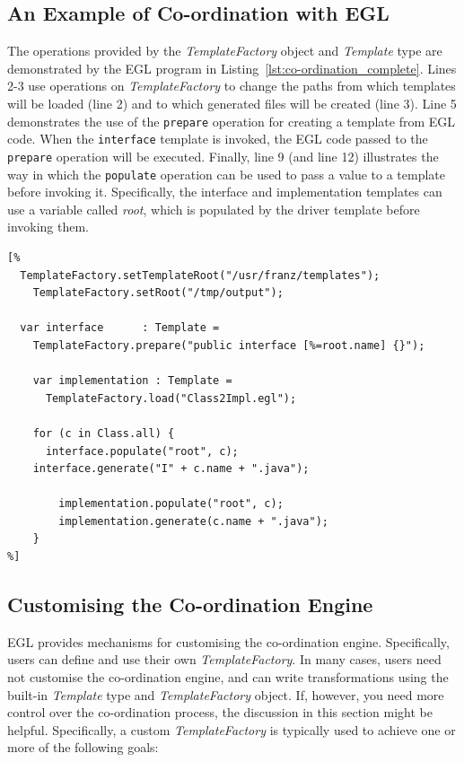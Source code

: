 \subsection{An Example of Co-ordination with EGL}
\label{sec:example_of_co-ordination}
The operations provided by the \emph{TemplateFactory} object and \emph{Template} type are demonstrated by the EGL program in Listing~\ref{lst:co-ordination_complete}. Lines 2-3 use operations on \emph{TemplateFactory} to change the paths from which templates will be loaded (line 2) and to which generated files will be created (line 3). Line 5 demonstrates the use of the \texttt{prepare} operation for creating a template from EGL code. When the \texttt{interface} template is invoked, the EGL code passed to the \texttt{prepare} operation will be executed. Finally, line 9 (and line 12) illustrates the way in which the \texttt{populate} operation can be used to pass a value to a template before invoking it. Specifically, the interface and implementation templates can use a variable called \emph{root}, which is populated by the driver template before invoking them.

\begin{lstlisting}[float=tbp, caption=Using the various operations provided by the Template type and TemplateFactory object., label=lst:co-ordination_complete, language=EGL]
[%
  TemplateFactory.setTemplateRoot("/usr/franz/templates");
	TemplateFactory.setRoot("/tmp/output");

  var interface      : Template =
    TemplateFactory.prepare("public interface [%=root.name] {}");
	
	var implementation : Template = 
	  TemplateFactory.load("Class2Impl.egl");

	for (c in Class.all) {
	  interface.populate("root", c);	
  	interface.generate("I" + c.name + ".java");
		
		implementation.populate("root", c);
		implementation.generate(c.name + ".java");
	}
%]
\end{lstlisting}

\subsection{Customising the Co-ordination Engine}
\label{sec:custom_co-ordination}
EGL provides mechanisms for customising the co-ordination engine. Specifically,
users can define and use their own \emph{TemplateFactory}. In many cases, 
users need not customise the co-ordination engine, and can write transformations
using the built-in \emph{Template} type and \emph{TemplateFactory} object. If, 
however, you need more control over the co-ordination process, the discussion in
this section might be helpful. Specifically, a custom \emph{TemplateFactory} 
is typically used to achieve one or more of the following goals:


